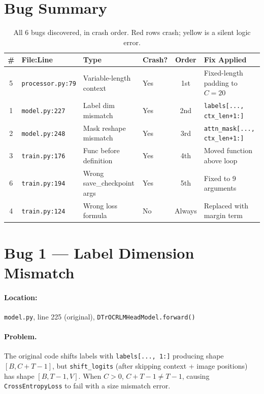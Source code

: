 \documentclass[11pt, a4paper]{report}
\begin{document}
\section{Bug Summary}
\label{sec:bug-summary}

\begin{table}[h]
\centering
\caption{All 6 bugs discovered, in crash order. Red rows crash; yellow is a silent logic error.}
\label{tab:bug-summary}
\small
\begin{tabularx}{\textwidth}{clllcX}
\toprule
\textbf{\#} & \textbf{File:Line} & \textbf{Type} & \textbf{Crash?} & \textbf{Order} & \textbf{Fix Applied} \\
\midrule
\rowcolor{red!8}
5 & \texttt{processor.py:79} & Variable-length context & Yes & 1st & Fixed-length padding to $C{=}20$ \\
\rowcolor{red!8}
1 & \texttt{model.py:227} & Label dim mismatch & Yes & 2nd & \texttt{labels[..., ctx\_len+1:]} \\
\rowcolor{red!8}
2 & \texttt{model.py:248} & Mask reshape mismatch & Yes & 3rd & \texttt{attn\_mask[..., ctx\_len+1:]} \\
\rowcolor{red!8}
3 & \texttt{train.py:176} & Func before definition & Yes & 4th & Moved function above loop \\
\rowcolor{red!8}
6 & \texttt{train.py:194} & Wrong save\_checkpoint args & Yes & 5th & Fixed to 9 arguments \\
\rowcolor{yellow!15}
4 & \texttt{train.py:124} & Wrong loss formula & No & Always & Replaced with margin term \\
\bottomrule
\end{tabularx}
\end{table}

\section{Bug 1 --- Label Dimension Mismatch}
\label{sec:bug1}

\paragraph{Location:} \texttt{model.py}, line 225 (original), \texttt{DTrOCRLMHeadModel.forward()}

\paragraph{Problem.} The original code shifts labels with \texttt{labels[..., 1:]} producing shape $[B, C{+}T{-}1]$, but \texttt{shift\_logits} (after skipping context + image positions) has shape $[B, T{-}1, V]$. When $C > 0$, $C{+}T{-}1 \neq T{-}1$, causing \texttt{CrossEntropyLoss} to fail with a size mismatch error.
\end{document}
